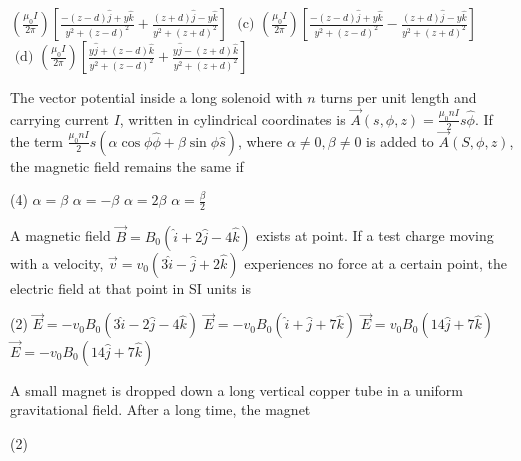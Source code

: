 \begin{enumerate}
\begin{tasks}
	\task[\textbf{B.}]$\left(\frac{\mu_{0} I}{2 \pi}\right)\left[\frac{-(z-d) \hat{j}+y \hat{k}}{y^{2}+(z-d)^{2}}+\frac{(z+d) \hat{j}-y \hat{k}}{y^{2}+(z+d)^{2}}\right]$
	\task[\textbf{C.}]$\text { (c) }\left(\frac{\mu_{0} I}{2 \pi}\right)\left[\frac{-(z-d) \hat{j}+y \hat{k}}{y^{2}+(z-d)^{2}}-\frac{(z+d) \hat{j}-y \hat{k}}{y^{2}+(z+d)^{2}}\right]$
	\task[\textbf{D.}]$\text { (d) }\left(\frac{\mu_{0} I}{2 \pi}\right)\left[\frac{y \hat{j}+(z-d) \hat{k}}{y^{2}+(z-d)^{2}}+\frac{y \hat{j}-(z+d) \hat{k}}{y^{2}+(z+d)^{2}}\right]$
\end{tasks}
\begin{minipage}{\textwidth}
	\item The vector potential inside a long solenoid with $n$ turns per unit length and carrying current $I$, written in cylindrical coordinates is $\vec{A}(s, \phi, z)=\frac{\mu_{0} n I}{2} s \hat{\phi}$. If the term $\frac{\mu_{0} n I}{2} s(\alpha \cos \phi \hat{\phi}+\beta \sin \phi \hat{s})$, where $\alpha \neq 0, \beta \neq 0$ is added to $\vec{A}(S, \phi, z)$, the magnetic field remains the same if
\end{minipage}
\begin{tasks}(4)
	\task[\textbf{A.}]$\alpha=\beta$
	\task[\textbf{B.}]$\alpha=-\beta$
	\task[\textbf{C.}]$\alpha=2 \beta$
	\task[\textbf{D.}]$\alpha=\frac{\beta}{2}$
\end{tasks}
\begin{minipage}{\textwidth}
	\item A magnetic field $\vec{B}=B_{0}(\hat{i}+2 \hat{j}-4 \hat{k})$ exists at point. If a test charge moving with a velocity, $\vec{v}=v_{0}(3 \hat{i}-\hat{j}+2 \hat{k})$ experiences no force at a certain point, the electric field at that point in SI units is
\end{minipage}
\begin{tasks}(2)
	\task[\textbf{A.}] $\vec{E}=-v_{0} B_{0}(3 \hat{i}-2 \hat{j}-4 \hat{k})$
	\task[\textbf{B.}]$\vec{E}=-v_{0} B_{0}(\hat{i}+\hat{j}+7 \hat{k})$
	\task[\textbf{C.}]$\vec{E}=v_{0} B_{0}(14 \hat{j}+7 \hat{k})$
	\task[\textbf{D.}]$\vec{E}=-v_{0} B_{0}(14 \hat{j}+7 \hat{k})$
\end{tasks}
\begin{minipage}{\textwidth}
	\item A small magnet is dropped down a long vertical copper tube in a uniform gravitational field. After a long time, the magnet
\end{minipage}
\begin{tasks}(2)

\end{tasks}
\end{enumerate}
